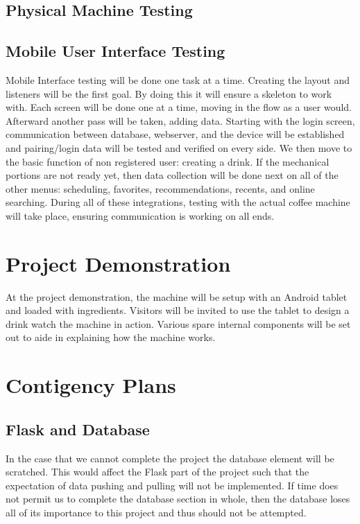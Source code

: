\documentclass[conference]{IEEEtran}
\begin{document}
\subsection{Physical Machine Testing}

\subsection{Mobile User Interface Testing}
Mobile Interface testing will be done one task at a time. Creating the layout and listeners will be the first
 goal. By doing this it will ensure a skeleton to work with. Each screen will be done one at a time,
moving in the flow as a user would. Afterward another pass will be taken, adding data. Starting with the
 login screen, communication between database, webserver, and the device will be established and
  pairing/login data will be tested and verified on every side. We then move to the basic function of non
  registered user: creating a drink. If the mechanical portions are not ready yet, then data collection will
   be done next on all of the other menus: scheduling, favorites, recommendations, recents, and online
    searching. During all of these integrations, testing with the actual coffee machine will take place, 
    ensuring communication is working on all ends. 

\section{Project Demonstration}
At the project demonstration, the machine will be setup with an Android tablet and loaded with ingredients.
Visitors will be invited to use the tablet to design a drink watch the machine
in action. Various spare internal components will be set out to aide in explaining how the machine works.


\section{Contigency Plans}
\subsection{Flask and Database}
In the case that we cannot complete the project the database element will be
scratched. This would affect the Flask part of the project such that the
expectation of data pushing and pulling will not be implemented.
If time does not permit us to complete the database section in whole, then the database loses all 
of its importance to this project and thus should not be attempted.
\end{document}
